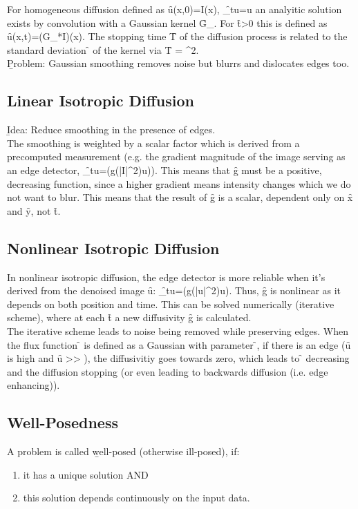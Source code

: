 For homogeneous diffusion defined as \f{u(x,0)=I(x)}, \f{\delta_tu=\Delta u} an analyitic solution exists by convolution with a Gaussian kernel \f{G_\sigma}. For \f{t>0} this is defined as \f{u(x,t)=(G_{}*I)(x)}. The stopping time \f{T} of the diffusion process is related to the standard deviation \f{\sigma} of the kernel via \f{T = \sigma^2}.\\[1em]
\b{Problem:} Gaussian smoothing removes noise but blurrs and dislocates edges too.

\subsection{Linear Isotropic Diffusion}
\b{Idea:} Reduce smoothing in the presence of edges.\\

The smoothing is weighted by a scalar factor which is derived from a precomputed measurement (e.g. the gradient magnitude of the image serving as an edge detector, \f{\delta_tu=(g(|\nabla I|^2)\nabla u)}). This means that \f{g} must be a positive, decreasing function, since a higher gradient means intensity changes which we do not want to blur. This means that the result of \f{g} is a scalar, dependent only on \f{x} and \f{y}, not \f{t}.

\subsection{Nonlinear Isotropic Diffusion}
In nonlinear isotropic diffusion, the edge detector is more reliable when it's derived from the denoised image \f{u}: \f{\delta_tu=(g(|\nabla u|^2)\nabla u)}. Thus, \f{g} is nonlinear as it depends on both position and time. This can be solved numerically (iterative scheme), where at each \f{t} a new diffusivity \f{g} is calculated.\\

The iterative scheme leads to noise being removed while preserving edges. When the flux function \f{\Phi} is defined as a Gaussian with parameter \f{\lambda}, if there is an edge (\f{\nabla u} is high and \f{\nabla u >> \lambda}), the diffusivitiy goes towards zero, which leads to \f{\Phi} decreasing and the diffusion stopping (or even leading to backwards diffusion (i.e. edge enhancing)).

\subsection{Well-Posedness}
A problem is called \b{well-posed} (otherwise ill-posed), if:
\begin{enumerate}
    \item it has a unique solution AND
    \item this solution depends continuously on the input data.
\end{enumerate}

